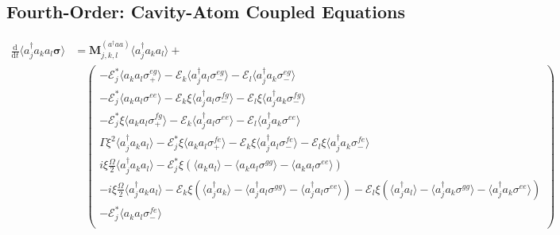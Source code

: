 \documentclass{article}
\newcommand{\ddt}{\frac{\mathrm{d}}{\mathrm{d}t}}
\begin{document}
\subsection{Fourth-Order: Cavity-Atom Coupled Equations}

\begin{subequations}
\begin{align}
	\ddt \langle a^{\dagger}_{j} a_{k} a_{l} \bm{\sigma} \rangle &= \bm{M}_{j, k, l}^{(a^{\dagger} a a)} \langle a^{\dagger}_{j} a_{k} a_{l} \rangle + \nonumber \\
	&\quad
	\begin{pmatrix}
		-\mathcal{E}_{j}^{*} \langle a_{k} a_{l} \sigma^{eg}_{+} \rangle - \mathcal{E}_{k} \langle a^{\dagger}_{j} a_{l} \sigma^{eg}_{-} \rangle - \mathcal{E}_{l} \langle a^{\dagger}_{j} a_{k} \sigma^{eg}_{-} \rangle \\
		-\mathcal{E}_{j}^{*} \langle a_{k} a_{l} \sigma^{ee} \rangle - \mathcal{E}_{k} \xi \langle a^{\dagger}_{j} a_{l} \sigma^{fg}_{-} \rangle - \mathcal{E}_{l} \xi \langle a^{\dagger}_{j} a_{k} \sigma^{fg}_{-} \rangle \\
		-\mathcal{E}_{j}^{*} \xi \langle a_{k} a_{l} \sigma^{fg}_{+} \rangle - \mathcal{E}_{k} \langle a^{\dagger}_{j} a_{l} \sigma^{ee} \rangle - \mathcal{E}_{l} \langle a^{\dagger}_{j} a_{k} \sigma^{ee} \rangle \\
		\Gamma \xi^{2} \langle a^{\dagger}_{j} a_{k} a_{l} \rangle - \mathcal{E}_{j}^{*} \xi \langle a_{k} a_{l} \sigma^{fe}_{+} \rangle - \mathcal{E}_{k} \xi \langle a^{\dagger}_{j} a_{l} \sigma^{fe}_{-} \rangle - \mathcal{E}_{l} \xi \langle a^{\dagger}_{j} a_{k} \sigma^{fe}_{-} \rangle \\
		i \xi \frac{\Omega}{2} \langle a^{\dagger}_{j} a_{k} a_{l} \rangle - \mathcal{E}_{j}^{*} \xi \left( \langle a_{k} a_{l} \rangle - \langle a_{k} a_{l} \sigma^{gg} \rangle - \langle a_{k} a_{l} \sigma^{ee} \rangle \right) \\
		-i \xi \frac{\Omega}{2} \langle a^{\dagger}_{j} a_{k} a_{l} \rangle - \mathcal{E}_{k} \xi \left( \langle a^{\dagger}_{j} a_{k} \rangle - \langle a^{\dagger}_{j} a_{l} \sigma^{gg} \rangle - \langle a^{\dagger}_{j} a_{l} \sigma^{ee} \rangle \right) - \mathcal{E}_{l} \xi \left( \langle a^{\dagger}_{j} a_{l} \rangle - \langle a^{\dagger}_{j} a_{k} \sigma^{gg} \rangle - \langle a^{\dagger}_{j} a_{k} \sigma^{ee} \rangle \right) \\
		-\mathcal{E}_{j}^{*} \langle a_{k} a_{l} \sigma^{fe}_{-} \rangle \\

\end{pmatrix}
\end{align}
\end{subequations}
\end{document}
